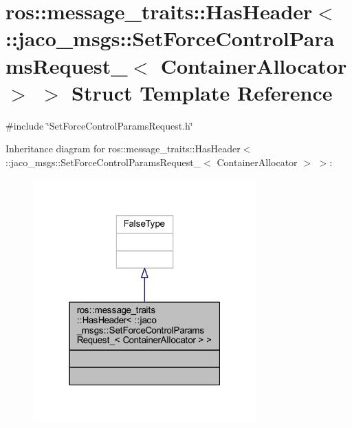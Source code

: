 \hypertarget{structros_1_1message__traits_1_1HasHeader_3_01_1_1jaco__msgs_1_1SetForceControlParamsRequest___3_01ContainerAllocator_01_4_01_4}{}\section{ros\+:\+:message\+\_\+traits\+:\+:Has\+Header$<$ \+:\+:jaco\+\_\+msgs\+:\+:Set\+Force\+Control\+Params\+Request\+\_\+$<$ Container\+Allocator $>$ $>$ Struct Template Reference}
\label{structros_1_1message__traits_1_1HasHeader_3_01_1_1jaco__msgs_1_1SetForceControlParamsRequest___3_01ContainerAllocator_01_4_01_4}


{\ttfamily \#include \char`\"{}Set\+Force\+Control\+Params\+Request.\+h\char`\"{}}



Inheritance diagram for ros\+:\+:message\+\_\+traits\+:\+:Has\+Header$<$ \+:\+:jaco\+\_\+msgs\+:\+:Set\+Force\+Control\+Params\+Request\+\_\+$<$ Container\+Allocator $>$ $>$\+:
\nopagebreak
\begin{figure}[H]
\begin{center}
\leavevmode
\includegraphics[width=244pt]{da/d5c/structros_1_1message__traits_1_1HasHeader_3_01_1_1jaco__msgs_1_1SetForceControlParamsRequest___31832fb8f4d18512264c05865eeedf99d}
\end{center}
\end{figure}


